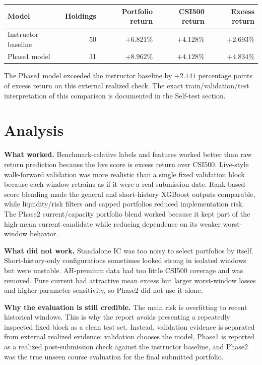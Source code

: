 \documentclass[11pt]{article}
\begin{document}
\begin{table}[h]
\centering
\begin{tabular}{lrrrr}
\toprule
Model & Holdings & Portfolio return & CSI500 return & Excess return \\
\midrule
Instructor baseline & 50 & \(+6.821\%\) & \(+4.128\%\) & \(+2.693\%\) \\
Phase1 model & 31 & \(+8.962\%\) & \(+4.128\%\) & \(+4.834\%\) \\
\bottomrule
\end{tabular}
\end{table}

The Phase1 model exceeded the instructor baseline by \(+2.141\) percentage
points of excess return on this external realized check. The exact
train/validation/test interpretation of this comparison is documented in the
Self-test section.

\clearpage

\section{Analysis}

\textbf{What worked.} Benchmark-relative labels and features worked better than
raw return prediction because the live score is excess return over CSI500.
Live-style walk-forward validation was more realistic than a single fixed
validation block because each window retrains as if it were a real submission
date. Rank-based score blending made the general and short-history XGBoost
outputs comparable, while liquidity/risk filters and capped portfolios reduced
implementation risk. The Phase2 current/capacity portfolio blend worked because
it kept part of the high-mean current candidate while reducing dependence on
its weaker worst-window behavior.

\textbf{What did not work.} Standalone IC was too noisy to select portfolios by
itself. Short-history-only configurations sometimes looked strong in isolated
windows but were unstable. AH-premium data had too little CSI500 coverage and
was removed. Pure current had attractive mean excess but larger worst-window
losses and higher parameter sensitivity, so Phase2 did not use it alone.

\textbf{Why the evaluation is still credible.} The main risk is overfitting to
recent historical windows. This is why the report avoids presenting a repeatedly
inspected fixed block as a clean test set. Instead, validation evidence is
separated from external realized evidence: validation chooses the model, Phase1
is reported as a realized post-submission check against the instructor baseline,
and Phase2 was the true unseen course evaluation for the final submitted
portfolio.
\end{document}
